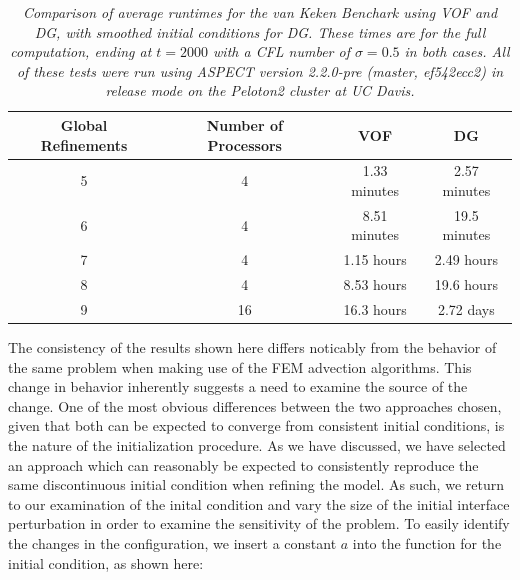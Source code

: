 \documentclass{article}
\begin{document}
\begin{table}
        \center
        \begin{tabular}{|c|c|cc|}
            \hline
            Global Refinements & Number of Processors & VOF & DG \\
            \hline
            5 & 4 & 1.33 minutes & 2.57 minutes \\
            6 & 4 & 8.51 minutes & 19.5 minutes \\
            7 & 4 & 1.15 hours & 2.49 hours \\
            8 & 4 & 8.53 hours & 19.6 hours \\
            9 & 16 & 16.3 hours & 2.72 days \\
            \hline
        \end{tabular}
        \caption{\it Comparison of average runtimes for the van Keken Benchark
            using VOF and DG, with smoothed initial conditions for DG. These
            times are for the full computation, ending at $t=2000$ with a CFL
            number of $\sigma=0.5$ in both cases. All of these tests were run
            using ASPECT version 2.2.0-pre (master, ef542ecc2) in release mode on
        the Peloton2 cluster at UC Davis.}
        \label{tab:vof-runtime-comparison-table}
\end{table}

The consistency of the results shown here differs noticably from the behavior
of the same problem when making use of the FEM advection algorithms.
This change in behavior inherently suggests a need to examine the source of the
change.
One of the  most obvious differences between the two approaches chosen, given
that both can be expected to converge from consistent initial conditions, is
the nature of the initialization procedure.
As we have discussed, we have selected an approach which can reasonably be
expected to consistently reproduce the same discontinuous initial condition
when refining the model.
As such, we return to our examination of the inital condition and vary the size
of the initial interface perturbation in order to examine the sensitivity of
the problem.
To easily identify the changes in the configuration, we insert a constant $a$
into the function for the initial condition, as shown here:


\end{document}
